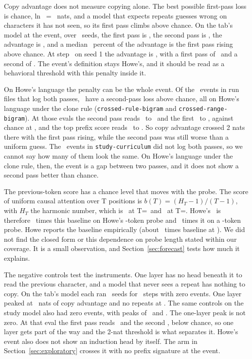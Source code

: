 \documentclass[10pt]{article}
\begin{document}
Copy advantage does not measure copying alone. The best possible first-pass loss is chance, ln \nTabV\ = \nChance\ nats, and a model that expects repeats guesses wrong on characters it has not seen, so its first pass climbs above chance. On the tab's model at the event, over \nTabRuns\ seeds, the first pass is \nTabFirstPass, the second pass is \nTabSecondPass, the advantage is \nTabAdvantage, and a median \nTabShare\ percent of the advantage is the first pass rising above chance. At step \nSavedStep\ on seed 1 the advantage is \nSavedAdv, with a first pass of \nSavedFirst\ and a second of \nSavedSecond. The event's definition stays Howe's, and it should be read as a behavioral threshold with this penalty inside it.

On Howe's language the penalty can be the whole event. Of the \nLoggedEvents\ events in run files that log both passes, \nLangEvents\ have a second-pass loss above chance, all on Howe's language under the clone rule (\texttt{crossed-rule-bigram} and \texttt{crossed-range-bigram}). At those evals the second pass reads \nLangSecondLow\ to \nLangSecondHigh\ and the first \nLangFirstLow\ to \nLangFirstHigh, against chance at \nChance, and the top prefix score reads \nLangPrefixLow\ to \nLangPrefixHigh. So copy advantage crossed 2 nats there with the first pass rising, while the second pass was still worse than a uniform guess. The \nLangUnlogged\ events in \texttt{study-curriculum} did not log both passes, so we cannot say how many of them look the same. On Howe's language under the clone rule, then, the event is a gap between two passes, and it does not show a second pass better than chance.

The previous-token score has a chance level that moves with the probe. The score of uniform causal attention over T positions is $b(T) = (H_T - 1)/(T - 1)$, with $H_T$ the harmonic number, which is \nBaseOneTwentyEight\ at T=\nPlanTwoT\ and \nBaseSixtyFour\ at T=\nStudyT. Howe's \nAnchorThreshold\ is therefore \nMultHigh\ times this baseline on Howe's \nCfgAProbeT-token probe and \nMultLow\ times it on a \nStudyT-token probe. Howe reports the baseline empirically (about \nHoweBaselineMult\ times baseline at \nHoweBaselineScore). We did not find the closed form or this dependence on probe length stated within our coverage. It is a small observation, and Section~\ref{sec:forecast} tests how much it explains.

The negative controls test the instruments. One layer has no head beneath it to read the previous character, and a model that never sees a repeat has nothing to copy. On the tab's model each ran \nNegSeeds\ seeds for \nNegBudget\ steps with zero events. One layer peaked at \nNegTabLayer\ nats of copy advantage and no repeats at \nNegTabNoRep. The same controls on the study model also had zero events, with peaks of \nNegStudyLayer\ and \nNegStudyNoRep. The one-layer peak is not zero. At that eval the first pass reads \nNegLayerFirst\ and the second \nNegLayerSecond, below chance, so one layer gets part of the way and the 2-nat threshold is what separates it. Howe's event also does not show an induction head by itself. The arm in Section~\ref{sec:exploratory} crosses it with no prefix signature at the event.
\end{document}

